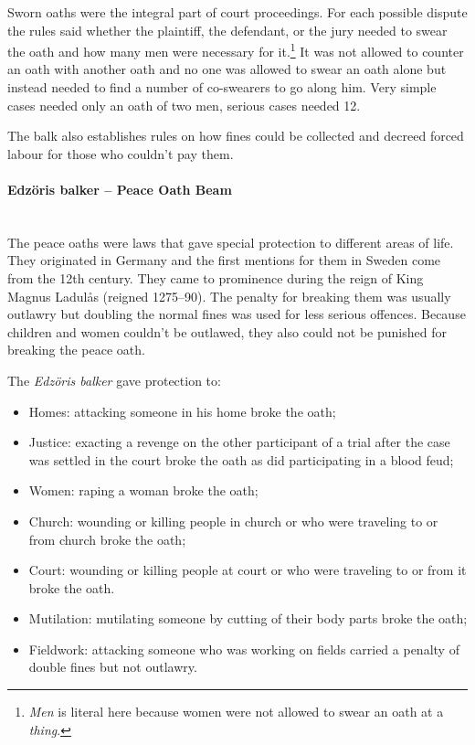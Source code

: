 \documentclass[a4paper]{article}
\begin{document}
Sworn oaths were the integral part of court proceedings. For each
possible dispute the rules said whether the plaintiff, the defendant,
or the jury needed to swear the oath and how many men were necessary
for it.\footnote{\emph{Men} is literal here because women were not
  allowed to swear an oath at a \emph{thing}.} It was not allowed to
counter an oath with another oath and no one was allowed to swear an
oath alone but instead needed to find a number of co-swearers to go
along him. Very simple cases needed only an oath of two men, serious
cases needed 12.

The balk also establishes rules on how fines could be collected and
decreed forced labour for those who couldn't pay them.

\paragraph {Edzöris balker – Peace Oath Beam} \mbox{}\\

The peace oaths were laws that gave special protection to different
areas of life. They originated in Germany and the first mentions for
them in Sweden come from the 12th century. They came to prominence
during the reign of King Magnus Ladulås (reigned 1275–90). The penalty
for breaking them was usually outlawry but doubling the normal fines
was used for less serious offences. Because children and women
couldn't be outlawed, they also could not be punished for breaking the
peace oath.

The \emph{Edzöris balker} gave protection to:

\begin{itemize}
\item Homes: attacking someone in his home broke the oath;
\item Justice: exacting a revenge on the other participant of a trial
  after the case was settled in the court broke the oath as did
  participating in a blood feud;
\item Women: raping a woman broke the oath;
\item Church: wounding or killing people in church or who were
  traveling to or from church broke the oath;
\item Court: wounding or killing people at court or who were traveling
  to or from it broke the oath.
\item Mutilation: mutilating someone by cutting of their body parts
  broke the oath;
\item Fieldwork: attacking someone who was working on fields carried a
  penalty of double fines but not outlawry.
\end{itemize}
\end{document}
